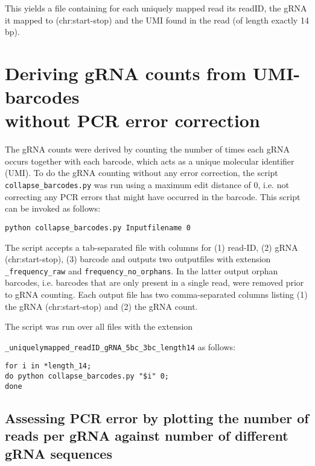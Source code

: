 This yields a file containing for each uniquely mapped read its readID, the gRNA it mapped to (chr:start-stop) and the UMI found in the read (of length exactly 14 bp).


\section[Deriving gRNA counts from UMI-barcodes without PCR error correction]{Deriving gRNA counts from UMI-barcodes \\without PCR error correction}

The gRNA counts were derived by counting the number of times each gRNA occurs together with each barcode, which acts as a unique molecular identifier (UMI). To do the gRNA counting without any error correction, the script \verb|collapse_barcodes.py| was run using a maximum edit distance of 0, i.e. not correcting any PCR errors that might have occurred in the barcode. This script can be invoked as follows:

\begin{small}\begin{lstlisting}
python collapse_barcodes.py Inputfilename 0
\end{lstlisting}\end{small}

The script accepts a tab-separated file with columns for (1) read-ID, (2) gRNA (chr:start-stop), (3) barcode and outputs two outputfiles with extension \verb|_frequency_raw| and \verb|frequency_no_orphans|. In the latter output orphan barcodes, i.e. barcodes that are only present in a single read, were removed prior to gRNA counting. Each output file has two comma-separated columns listing (1) the gRNA (chr:start-stop) and (2) the gRNA count.

The script was run over all files with the extension

\verb|_uniquelymapped_readID_gRNA_5bc_3bc_length14| as follows:

\begin{small}\begin{lstlisting}
for i in *length_14;
do python collapse_barcodes.py "$i" 0;
done
\end{lstlisting}\end{small}


\subsection{Assessing PCR error by plotting the number of reads per gRNA against number of different gRNA sequences}

